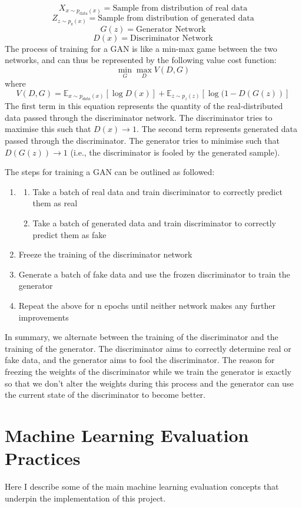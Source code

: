 \documentclass[12pt,a4paper,twoside]{report}
\begin{document}
$$X_{x\sim p_\text{data}(x)} = \text{Sample from distribution of real data} $$
$$Z_{z\sim p_\text{z}(x)} = \text{Sample from distribution of generated data} $$
$$G(z) = \text{Generator Network}$$
$$D(x) = \text{Discriminator Network}$$
The process of training for a GAN is like a min-max game between the two networks, and can thus be represented by the following value cost function:
$$\min _ { G } \max _ { D } V ( D ,G )$$
where 
$$V ( D ,G ) = \mathbb { E } _ { x \sim p _ { d a t a } ( x ) } [ \log D ( x ) ] + \mathbb { E } _ { z \sim p _ { z } ( z ) }[ \log ( 1- D ( G ( z ) ) ] $$
The first term in this equation represents the quantity of the real-distributed data passed through the discriminator network. The discriminator tries to maximise this such that $D(x)\rightarrow 1$. The second term represents generated data passed through the discriminator. The generator tries to minimise such that $D(G(z))\rightarrow 1$ (i.e., the discriminator is fooled by the generated sample).

The steps for training a GAN can be outlined as followed:
\begin{enumerate}[Step 1:]
  \item 
  \begin{enumerate}
  \item Take a batch of real data and train discriminator to correctly predict them as real
  \item Take a batch of generated data and train discriminator to correctly predict them as fake
\end{enumerate}
  
  \item Freeze the training of the discriminator network
  \item Generate a batch of fake data and use the frozen discriminator to train the generator
  \item Repeat the above for n epochs until neither network makes any further improvements
\end{enumerate}

In summary, we alternate between the training of the discriminator and the training of the generator. The discriminator aims to correctly determine real or fake data, and the generator aims to fool the discriminator. The reason for freezing the weights of the discriminator while we train the generator is exactly so that we don't alter the weights during this process and the generator can use the current state of the discriminator to become better.

\section{Machine Learning Evaluation Practices}
Here I describe some of the main machine learning evaluation concepts that underpin the implementation of this project. 
\end{document}
